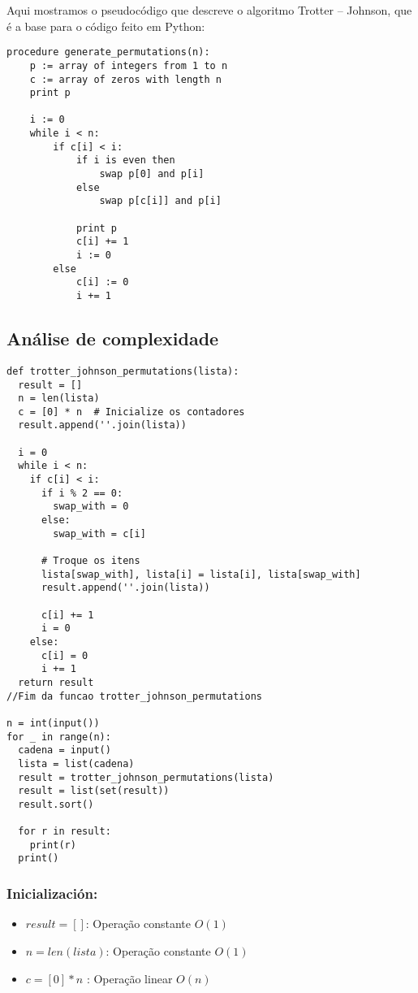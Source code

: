 \documentclass{article}
\begin{document}
Aqui mostramos o pseudocódigo que descreve o algoritmo Trotter – Johnson, que é a base para o código feito em Python:

\begin{lstlisting}
procedure generate_permutations(n):
    p := array of integers from 1 to n
    c := array of zeros with length n
    print p

    i := 0
    while i < n:
        if c[i] < i:
            if i is even then
                swap p[0] and p[i]
            else
                swap p[c[i]] and p[i]

            print p
            c[i] += 1
            i := 0
        else
            c[i] := 0
            i += 1
\end{lstlisting}

\subsection {Análise de complexidade}

\begin{lstlisting}[breaklines=true]
def trotter_johnson_permutations(lista):
  result = []
  n = len(lista)
  c = [0] * n  # Inicialize os contadores
  result.append(''.join(lista))
    
  i = 0
  while i < n:
    if c[i] < i:
      if i % 2 == 0:
        swap_with = 0
      else:
        swap_with = c[i]
                
      # Troque os itens
      lista[swap_with], lista[i] = lista[i], lista[swap_with]
      result.append(''.join(lista))
            
      c[i] += 1
      i = 0
    else:
      c[i] = 0
      i += 1
  return result
//Fim da funcao trotter_johnson_permutations

n = int(input())
for _ in range(n):
  cadena = input()
  lista = list(cadena)
  result = trotter_johnson_permutations(lista)
  result = list(set(result))
  result.sort()
    
  for r in result:
    print(r)
  print()
\end{lstlisting}

\subsubsection {Inicialización:}
\begin{itemize}
    \item $result = [ ]$: Operação constante $ O(1) $
    \item $n = len(lista)$: Operação constante $ O(1) $
    \item $c = [0] * n$  : Operação linear $ O(n) $
\end{itemize}
\end{document}
